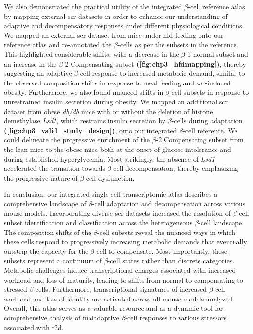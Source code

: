 \par We also demonstrated the practical utility of the integrated $\beta$-cell reference atlas by mapping external \gls{scr} datasets in order to enhance our understanding of adaptive and decompensatory responses under different physiological conditions. We mapped an external \gls{scr} dataset from mice under \gls{hfd} feeding onto our reference atlas and re-annotated the $\beta$-cells as per the subsets in the reference. This highlighted considerable shifts, with a decrease in the $\beta$-1 normal subset and an increase in the $\beta$-2 Compensating subset \textbf{(\autoref{fig:chp3_hfdmapping})}, thereby suggesting an adaptive $\beta$-cell response to increased metabolic demand, similar to the observed composition shifts in response to meal feeding and \gls{wd}-induced obesity. Furthermore, we also found nuanced shifts in $\beta$-cell subsets in response to unrestrained insulin secretion during obesity. We mapped an additional \gls{scr} dataset from obese \textit{db/db} mice with or without the deletion of histone demethylase \textit{Lsd1}, which restrains insulin secretion by $\beta$-cells during adaptation \textbf{(\autoref{fig:chp3_valid_study_design})}, onto our integrated $\beta$-cell reference. We could delineate the progressive enrichment of the $\beta$-2 Compensating subset from the lean mice to the obese mice both at the onset of glucose intolerance and during established hyperglycemia. Most strikingly, the absence of \textit{Lsd1} accelerated the transition towards $\beta$-cell decompensation, thereby emphasizing the progressive nature of $\beta$-cell dysfunction.\\

\par In conclusion, our integrated single-cell transcriptomic atlas describes a comprehensive landscape of $\beta$-cell adaptation and decompensation across various mouse models. Incorporating diverse \gls{scr} datasets increased the resolution of $\beta$-cell subset identification and classification across the heterogeneous $\beta$-cell landscape. The composition shifts of the $\beta$-cell subsets reveal the nuanced ways in which these cells respond to progressively increasing metabolic demands that eventually outstrip the capacity for the $\beta$-cell to compensate. Most importantly, these subsets represent a continuum of $\beta$-cell states rather than discrete categories. Metabolic challenges induce transcriptional changes associated with increased workload and loss of maturity, leading to shifts from normal to compensating to stressed $\beta$-cells. Furthermore, transcriptional signatures of increased $\beta$-cell workload and loss of identity are activated across all mouse models analyzed. Overall, this atlas serves as a valuable resource and as a dynamic tool for comprehensive analysis of maladaptive $\beta$-cell responses to various stressors associated with \gls{t2d}.

